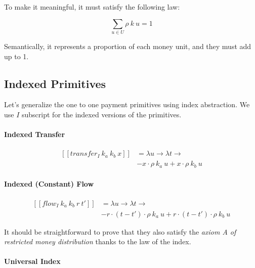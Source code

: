 To make it meaningful, it must satisfy the following law:

\begin{equation}
    \displaystyle \sum_{u \in U} \rho\ k\ u = 1
\end{equation}

Semantically, it represents a proportion of each money unit, and they must add up to 1.

\subsection{Indexed Primitives}

Let's generalize the one to one payment primitives using index abstraction. We use $I$ subscript for
the indexed versions of the primitives.

\paragraph{Indexed Transfer}

\begin{equation}
    \begin{split}
        [\![transfer_I\ k_a\ k_b\ x]\!] &=
        \lambda u \rightarrow \lambda t \rightarrow \\
        &-x \cdot \rho\ k_a\ u + x \cdot \rho\ k_b\ u
    \end{split}
\end{equation}

\paragraph{Indexed (Constant) Flow}

\begin{equation}
    \begin{split}
        [\![flow_I\ k_a\ k_b\ r\ t']\!] &=
        \lambda u \rightarrow \lambda t \rightarrow \\
        &-r \cdot (t - t') \cdot \rho\ k_a\ u + r \cdot (t - t') \cdot \rho\ k_b\ u
    \end{split}
\end{equation}

It should be straightforward to prove that they also satisfy the \textit{axiom A of restricted money
distribution} thanks to the law of the index.

\paragraph{Universal Index}

